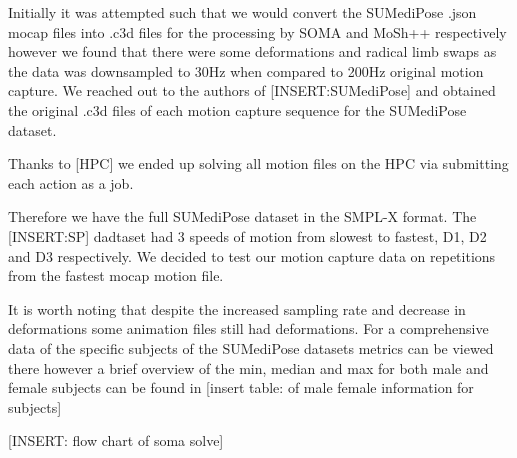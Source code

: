 Initially it was attempted such that we would convert the SUMediPose .json mocap files into .c3d files for the processing by SOMA and MoSh++ respectively however we found that there were some deformations and radical limb swaps as the data was downsampled to 30Hz when compared to 200Hz original motion capture. We reached out to the authors of [INSERT:SUMediPose] and obtained the original .c3d files of each motion capture sequence for the SUMediPose dataset. 

Thanks to [HPC] we ended up solving all motion files on the HPC via submitting each action as a job. 

Therefore we have the full SUMediPose dataset in the SMPL-X format. The [INSERT:SP] dadtaset had 3 speeds of motion from slowest to fastest, D1, D2 and D3 respectively.
We decided to test our motion capture data on repetitions from the fastest mocap motion file.

It is worth noting that despite the increased sampling rate and decrease in deformations some animation files still had deformations.
For a comprehensive data of the specific subjects of the SUMediPose datasets metrics can be viewed there however a brief overview of the min, median and max for both male and female subjects can be found in [insert table: of male female information for subjects]


[INSERT: flow chart of soma solve]


